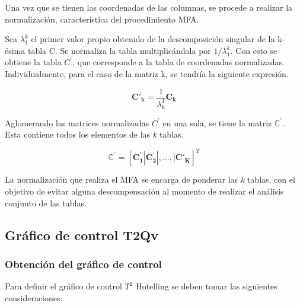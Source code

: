 \documentclass[water,article,submit,moreauthors,pdftex]{mdpi}
\begin{document}
Una vez que se tienen las coordenadas de las columnas, se procede a
realizar la normalización, característica del procedimiento MFA.

Sea \(\lambda_{1}^{k}\) el primer valor propio obtenido de la
descomposición singular de la k-ésima tabla C. Se normaliza la tabla
multiplicándola por \(1/\lambda_{1}^{k}\). Con esto se obtiene la tabla
\(C^{'}\), que corresponde a la tabla de coordenadas normalizadas.\\
Individualmente, para el caso de la matriz k, se tendría la siguiente
expresión.

\begin{equation}
\mathbf{C'_k}=\frac{1}{\lambda_{k}^1} \mathbf{C_k}
\label{eq:Cprimak}
\end{equation}

Aglomerando las matrices normalizadas \(C^{'}\) en una sola, se tiene la
matriz \(\mathbb{C}^{'}\). Esta contiene todos los elementos de las
\emph{k} tablas.

\begin{equation}
\mathbf{\mathbb{C^{'}}}=[\mathbf{C_1^{'}}|\mathbf{C_2^{'}}|,...,|\mathbf{C'_{K}}]^{T}
\label{eq:Cprima}
\end{equation}

La normalización que realiza el MFA se encarga de ponderar las \emph{k}
tablas, con el objetivo de evitar alguna descompensación al momento de
realizar el análisis conjunto de las tablas.

\hypertarget{gruxe1fico-de-control-t2qv}{%
\subsection{Gráfico de control T2Qv}\label{gruxe1fico-de-control-t2qv}}

\hypertarget{obtenciuxf3n-del-gruxe1fico-de-control}{%
\subsubsection{Obtención del gráfico de
control}\label{obtenciuxf3n-del-gruxe1fico-de-control}}

Para definir el gráfico de control \(T^2\) Hotelling se deben tomar las
siguientes consideraciones:
\end{document}
